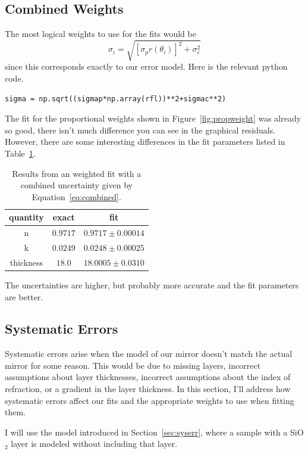 \documentclass[english]{scrartcl}
\begin{document}
\subsection{Combined Weights}
The most logical weights to use for the fits would be
\begin{equation}
\sigma_i = \sqrt{[\sigma_p r(\theta_i)]^2+\sigma_c^2}\label{eq:combined}
\end{equation}
since this corresponds exactly to our error model. Here is
the relevant python code.
\begin{lstlisting}
sigma = np.sqrt((sigmap*np.array(rfl))**2+sigmac**2)
\end{lstlisting}
The fit
for the proportional weights shown in Figure~\ref{fig:propweight}
was already so good, there isn't much difference you can see in the
graphical residuals. However, there are some interesting differences
in the fit parameters listed in Table~\ref{tab:combweight}.
\begin{table}[htb]
\begin{center}
\begin{tabular}{| c | c | c |}
\hline
quantity & exact & fit\\ \hline\hline
n & $0.9717$ & $0.9717\pm 0.00014$\\
k & $0.0249$ & $0.0248\pm 0.00025$\\
thickness & $18.0$ & $18.0005\pm 0.0310$\\ \hline
\end{tabular}
\end{center}
\caption{\label{tab:combweight}Results from an weighted fit with a
combined uncertainty given by Equation~\ref{eq:combined}.}
\end{table}
The uncertainties are higher, but probably more accurate and the
fit parameters are better.

\subsection{Systematic Errors}
Systematic errors arise when the model of our mirror
doesn't match the actual mirror for some reason. This would
be due to missing layers, incorrect assumptions about layer
thicknesses, incorrect assumptions about the index of
refraction, or a gradient in the layer thickness. In this
section, I'll address how systematic errors affect our
fits and the appropriate weights to use when fitting them.

I will use the model introduced in Section~\ref{sec:syserr},
where a sample with a SiO$_2$ layer is modeled without
including that layer.
\end{document}
